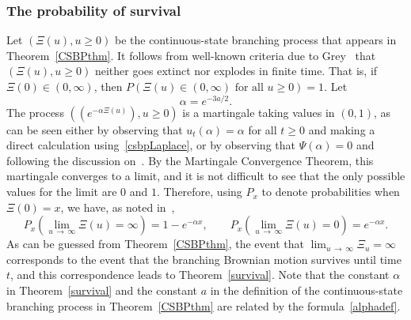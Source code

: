\documentclass[AHL,Unicode,longabstracts,published]{cedram}
\newcommand{\1} {\mathds{1}}
\begin{document}
\subsubsection{The probability of survival}
Let $(\Xi(u), u \geq 0)$ be the continuous-state branching process that appears in Theorem~\ref{CSBPthm}. It follows from well-known criteria due to Grey~\cite{grey} that $(\Xi(u), u \geq 0)$ neither goes extinct nor explodes in finite time. That is, if $\Xi(0) \in (0, \infty)$, then $P(\Xi(u) \in (0, \infty) \text{ for all }u \geq 0) = 1$. Let
\begin{equation}\label{alphadef}
\alpha = e^{-3a/2}.
\end{equation}
The process $((e^{-\alpha \Xi(u)}), u \geq 0)$ is a martingale taking values in $(0, 1)$, as can be seen either by observing that $u_t(\alpha) = \alpha$ for all $t \geq 0$ and making a direct calculation using~\eqref{csbpLaplace}, or by observing that $\Psi(\alpha) = 0$ and following the discussion on~\cite[p.~716]{bfm08}. By the Martingale Convergence Theorem, this martingale converges to a limit, and it is not difficult to see that the only possible values for the limit are $0$ and $1$. Therefore, using $P_x$ to denote probabilities when $\Xi(0) = x$, we have, as noted in~\cite{bfm08},
\begin{equation}\label{CSBPsurvival}
P_x \left(\lim_{u\,\rightarrow\,\infty} \Xi(u) = \infty \right) = 1 - e^{-\alpha x}, \qquad P_x \left(\lim_{u \,\rightarrow\,\infty} \Xi(u) = 0 \right) = e^{-\alpha x}.
\end{equation}
As can be guessed from Theorem~\ref{CSBPthm}, the event that $\lim_{u\,\rightarrow\,\infty} \Xi_u = \infty$ corresponds to the event that the branching Brownian motion survives until time $t$, and this correspondence leads to Theorem~\ref{survival}. Note that the constant $\alpha$ in Theorem~\ref{survival} and the constant $a$ in the definition of the continuous-state branching process in Theorem~\ref{CSBPthm} are related by the formula~\eqref{alphadef}.
\end{document}
